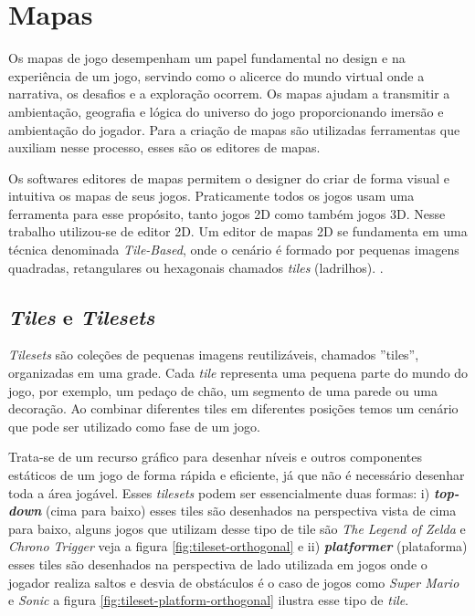 \section{Mapas}
\label{sec-mapas}

Os mapas de jogo desempenham um papel fundamental no design e na experiência de um jogo, servindo como o alicerce do mundo virtual onde a narrativa, os desafios e a exploração ocorrem. Os mapas ajudam a transmitir a ambientação, geografia e lógica do universo do jogo proporcionando imersão e ambientação do jogador. Para a criação de mapas são utilizadas ferramentas que auxiliam nesse processo, esses são os editores de mapas.

 Os softwares editores de mapas permitem o designer do criar de forma visual e intuitiva os mapas de seus jogos. Praticamente todos os jogos usam uma ferramenta para esse propósito, tanto jogos 2D como também jogos 3D. Nesse trabalho  utilizou-se de editor 2D. Um editor de mapas 2D se fundamenta em uma técnica denominada \textit{Tile-Based}, onde o cenário é formado por pequenas imagens quadradas, retangulares ou hexagonais chamados \textit{tiles} (ladrilhos). .

\subsection{\textit{Tiles} e \textit{Tilesets}}
\label{sec:tiles-e-tilesets}
\textit{Tilesets} são coleções de pequenas imagens reutilizáveis, chamados ''tiles'', organizadas em uma grade. Cada \textit{tile} representa uma pequena parte do mundo do jogo, por exemplo, um pedaço de chão, um segmento de uma parede ou uma decoração. Ao combinar diferentes tiles em diferentes posições temos um cenário que pode ser utilizado como fase de um jogo. 

Trata-se de um recurso gráfico para desenhar níveis e outros componentes estáticos de um jogo de forma rápida e eficiente, já que não é necessário desenhar toda a área jogável. Esses \textit{tilesets} podem ser essencialmente duas formas: i) \textit{\textbf{top-down}} (cima para baixo) esses tiles são desenhados na perspectiva vista de cima para baixo, alguns jogos que utilizam desse tipo de tile são \textit{The Legend of Zelda} e \textit{Chrono Trigger} veja a figura \ref{fig:tileset-orthogonal} e ii) \textit{\textbf{platformer}} (plataforma) esses tiles são desenhados na perspectiva de lado utilizada em jogos onde o jogador realiza saltos e desvia de obstáculos é o caso de jogos como \textit{Super Mario} e \textit{Sonic} a figura \ref{fig:tileset-platform-orthogonal} ilustra esse tipo de \textit{tile}.

